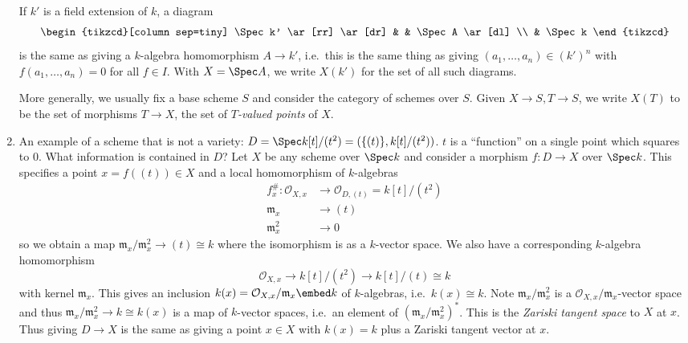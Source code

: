 \documentclass[a4paper]{article}
\newcommand{\sh}[1]{\mathcal{#1}} %
\begin{document}
\begin{eg}
\begin{enumerate}
    If \(k'\) is a field extension of \(k\), a diagram
    \[
      \begin{tikzcd}[column sep=tiny]
        \Spec k' \ar[rr] \ar[dr] & & \Spec A \ar[dl] \\
        & \Spec k
      \end{tikzcd}
    \]
    is the same as giving a \(k\)-algebra homomorphism \(A \to k'\), i.e.\ this is the same thing as giving \((a_1, \dots, a_n) \in (k')^n\) with \(f(a_1, \dots, a_n) = 0\) for all \(f \in I\). With \(X = \Spec A\), we write \(X(k')\) for the set of all such diagrams.

    More generally, we usually fix a base scheme \(S\) and consider the category of schemes over \(S\). Given \(X \to S, T \to S\), we write \(X(T)\) to be the set of morphisms \(T \to X\), the set of \emph{\(T\)-valued points} of \(X\).
  \item An example of a scheme that is not a variety: \(D = \Spec k[t]/(t^2) = (\{(t)\}, k[t]/(t^2))\). \(t\) is a ``function'' on a single point which squares to \(0\). What information is contained in \(D\)? Let \(X\) be any scheme over \(\Spec k\) and consider a morphism \(f: D \to X\) over \(\Spec k\). This specifies a point \(x = f((t)) \in X\) and a local homomorphism of \(k\)-algebras
    \begin{align*}
      f_x^\#: \sh O_{X, x} &\to \sh O_{D, (t)} = k[t]/(t^2) \\
      \mathfrak m_x &\to (t) \\
      \mathfrak m_x^2 &\to 0
    \end{align*}
    so we obtain a map \(\mathfrak m_x/\mathfrak m_x^2 \to (t) \cong k\) where the isomorphism is as a \(k\)-vector space. We also have a corresponding \(k\)-algebra homomorphism
    \[
      \sh O_{X, x} \to k[t]/(t^2) \to k[t]/(t) \cong k
    \]
    with kernel \(\mathfrak m_x\). This gives an inclusion \(k(x) = \sh O_{X, x}/\mathfrak m_x \embed k\) of \(k\)-algebras, i.e.\ \(k(x) \cong k\). Note \(\mathfrak m_x/\mathfrak m_x^2\) is a \(\sh O_{X, x}/\mathfrak m_x\)-vector space and thus \(\mathfrak m_x/\mathfrak m_x^2 \to k \cong k(x)\) is a map of \(k\)-vector spaces, i.e.\ an element of \((\mathfrak m_x/\mathfrak m_x^2)^*\). This is the \emph{Zariski tangent space} to \(X\) at \(x\). Thus giving \(D \to X\) is the same as giving a point \(x \in X\) with \(k(x) = k\) plus a Zariski tangent vector at \(x\).
  \end{enumerate}
\end{eg}
\end{document}
